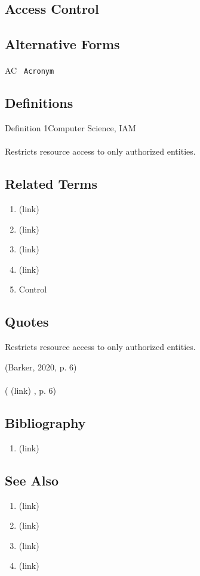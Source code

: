 \newpage \subsection*{Access Control } \subsection*{Alternative Forms } \paragraph{} AC  \texttt{ Acronym  } \subsection*{Definitions } \begin{DIC_Def}{Definition 1Computer Science, IAM }{} \paragraph{} Restricts resource access to only authorized entities.  \end{DIC_Def} \subsection*{Related Terms } \begin{enumerate} \item  (link) \href{Access (Dictionary Entry) }{ }   \item  (link) \href{Access Control Mechanism (Dictionary Entry) }{ }   \item  (link) \href{Access Control Model (Dictionary Entry) }{ }   \item  (link) \href{Access Control Policy (Dictionary Entry) }{ }   \item  Control  \end{enumerate} \subsection*{Quotes } \begin{DIC_BlockQuote} Restricts resource access to only authorized entities.  \end{DIC_BlockQuote} (Barker, 2020, p. 6)  \paragraph{} (  (link) \href{Barker, 2020 }{ } , p. 6)  \subsection*{Bibliography } \begin{enumerate} \item  (link) \href{Barker, 2020 }{ }   \end{enumerate} \subsection*{See Also } \begin{enumerate} \item  (link) \href{Access (Dictionary Entry) }{ }   \item  (link) \href{Access Control Mechanism (Dictionary Entry) }{ }   \item  (link) \href{Access Control Model (Dictionary Entry) }{ }   \item  (link) \href{Access Control Policy (Dictionary Entry) }{ } \end{enumerate} 